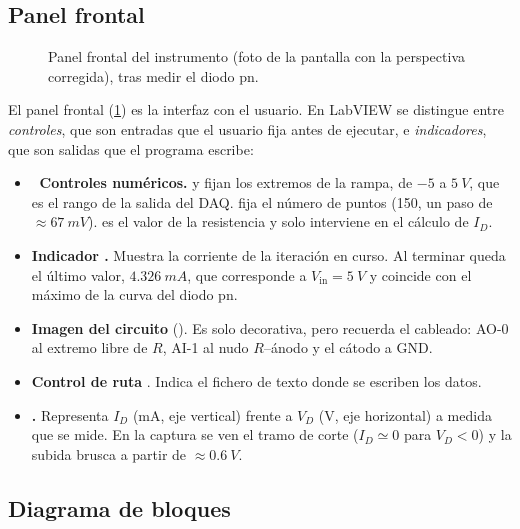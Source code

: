 \documentclass[10pt,a4paper]{article}
\begin{document}
\subsection{Panel frontal}

\begin{figure}[htbp]
  \centering
  
  \caption{Panel frontal del instrumento (foto de la pantalla con la
  perspectiva corregida), tras medir el diodo pn.}
  \label{fig:panel}
\end{figure}

El panel frontal (\cref{fig:panel}) es la interfaz con el usuario. En LabVIEW
se distingue entre \emph{controles}, que son entradas que el usuario fija antes
de ejecutar, e \emph{indicadores}, que son salidas que el programa escribe:

\begin{itemize}[leftmargin=1.2em]
  \item \textbf{\textcolor{ambar}{}\, Controles numéricos.}
     y  fijan los extremos de la rampa, de $-5$
    a $\SI{5}{V}$, que es el rango de la salida del DAQ.  fija el
    número de puntos (150, un paso de $\approx\SI{67}{mV}$).  es
    el valor de la resistencia y solo interviene en el cálculo de $I_D$.
  \item \textbf{\textcolor{cVerde}{} Indicador .}
    Muestra la corriente de la iteración en curso. Al terminar queda el
    último valor, $\SI{4.326}{mA}$, que corresponde a
    $V_{\text{in}}=\SI{5}{V}$ y coincide con el máximo de la curva del diodo pn.
  \item \textbf{\textcolor{azul}{} Imagen del circuito}
    (). Es solo decorativa, pero recuerda el cableado: AO-0
    al extremo libre de $R$, AI-1 al nudo $R$--ánodo y el cátodo a GND.
  \item \textbf{\textcolor{navy}{} Control de ruta} .
    Indica el fichero de texto donde se escriben los datos.
  \item \textbf{\textcolor{cUV}{} .} Representa $I_D$
    (mA, eje vertical) frente a $V_D$ (V, eje horizontal) a medida que se
    mide. En la captura se ven el tramo de corte ($I_D\simeq0$ para $V_D<0$) y
    la subida brusca a partir de $\approx\SI{0.6}{V}$.
\end{itemize}

\subsection{Diagrama de bloques}
\end{document}
